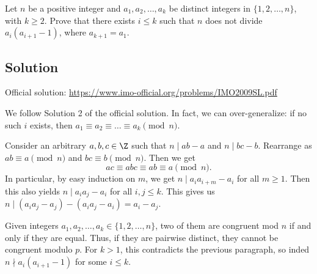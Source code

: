 Let $n$ be a positive integer and $a_1, a_2, \ldots, a_k$ be distinct integers in $\{1, 2, \ldots, n\}$, with $k \geq 2$.
Prove that there exists $i \leq k$ such that $n$ does not divide $a_i (a_{i + 1} - 1)$, where $a_{k + 1} = a_1$.



\subsection*{Solution}

Official solution: \url{https://www.imo-official.org/problems/IMO2009SL.pdf}

We follow Solution 2 of the official solution.
In fact, we can over-generalize: if no such $i$ exists, then $a_1 \equiv a_2 \equiv \ldots \equiv a_k \pmod{n}$.

Consider an arbitrary $a, b, c \in \Z$ such that $n \mid ab - a$ and $n \mid bc - b$.
Rearrange as $ab \equiv a \pmod{n}$ and $bc \equiv b \pmod{n}$.
Then we get
\[ ac \equiv abc \equiv ab \equiv a \pmod{n}. \]
In particular, by easy induction on $m$, we get $n \mid a_i a_{i + m} - a_i$ for all $m \geq 1$.
Then this also yields $n \mid a_i a_j - a_i$ for all $i, j \leq k$.
This gives us $n \mid (a_i a_j - a_j) - (a_i a_j - a_i) = a_i - a_j$.

Given integers $a_1, a_2, \ldots, a_k \in \{1, 2, \ldots, n\}$, two of them are congruent mod $n$ if and only if they are equal.
Thus, if they are pairwise distinct, they cannot be congruent modulo $p$.
For $k > 1$, this contradicts the previous paragraph, so inded $n \nmid a_i (a_{i + 1} - 1)$ for some $i \leq k$.
